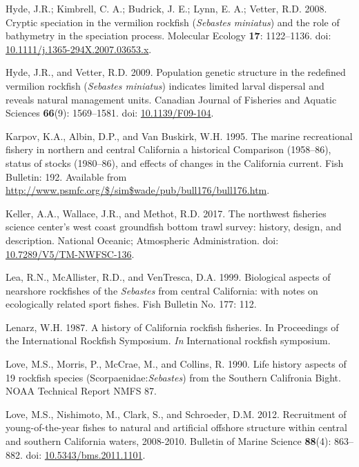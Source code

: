 \documentclass[
  english,
  a4paper,
]{article}
\newlength{\cslhangindent}
\newlength{\cslentryspacingunit} %
\newenvironment{CSLReferences}[2] %
 {%
  \setlength{\parindent}{0pt}
  \ifodd #1
  \let\oldpar\par
  \def\par{\hangindent=\cslhangindent\oldpar}
  \fi
  \setlength{\parskip}{#2\cslentryspacingunit}
 }%
 {}
\begin{document}
\begin{CSLReferences}{1}{0}
\leavevmode{}%
Hyde, J.R.; Kimbrell, C. A.; Budrick, J. E.; Lynn, E. A.; Vetter, R.D. 2008. {Cryptic speciation in the vermilion rockfish (\emph{Sebastes miniatus}) and the role of bathymetry in the speciation process}. Molecular Ecology \textbf{17}: 1122--1136. doi: \href{https://doi.org/10.1111/j.1365-294X.2007.03653.x}{10.1111/j.1365-294X.2007.03653.x}.

\leavevmode{}%
Hyde, J.R., and Vetter, R.D. 2009. {Population genetic structure in the redefined vermilion rockfish (\emph{Sebastes miniatus}) indicates limited larval dispersal and reveals natural management units}. Canadian Journal of Fisheries and Aquatic Sciences \textbf{66}(9): 1569--1581. doi: \href{https://doi.org/10.1139/F09-104}{10.1139/F09-104}.

\leavevmode{}%
Karpov, K.A., Albin, D.P., and Van Buskirk, W.H. 1995. {The marine recreational fishery in northern and central California a historical Comparison (1958--86), status of stocks (1980--86), and effects of changes in the California current}. Fish Bulletin: 192. Available from \url{http://www.psmfc.org/$/sim$wade/pub/bull176/bull176.htm}.

\leavevmode{}%
Keller, A.A., Wallace, J.R., and Methot, R.D. 2017. {The northwest fisheries science center's west coast groundfish bottom trawl survey: history, design, and description}. National Oceanic; Atmospheric Administration. doi: \href{https://doi.org/10.7289/V5/TM-NWFSC-136}{10.7289/V5/TM-NWFSC-136}.

\leavevmode{}%
Lea, R.N., McAllister, R.D., and VenTresca, D.A. 1999. {Biological aspects of nearshore rockfishes of the \emph{Sebastes} from central California: with notes on ecologically related sport fishes.} Fish Bulletin No. 177: 112.

\leavevmode{}%
Lenarz, W.H. 1987. {A history of California rockfish fisheries. In Proceedings of the International Rockfish Symposium.} \emph{In} International rockfish symposium.

\leavevmode{}%
Love, M.S., Morris, P., McCrae, M., and Collins, R. 1990. {Life history aspects of 19 rockfish species (Scorpaenidae:\emph{Sebastes}) from the Southern Califronia Bight}. NOAA Technical Report NMFS 87.

\leavevmode{}%
Love, M.S., Nishimoto, M., Clark, S., and Schroeder, D.M. 2012. {Recruitment of young-of-the-year fishes to natural and artificial offshore structure within central and southern California waters, 2008-2010}. Bulletin of Marine Science \textbf{88}(4): 863--882. doi: \href{https://doi.org/10.5343/bms.2011.1101}{10.5343/bms.2011.1101}.


\end{CSLReferences}
\end{document}
